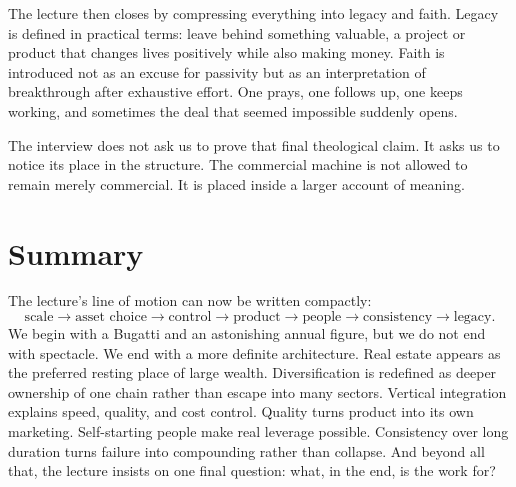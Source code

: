 The lecture then closes by compressing everything into legacy and faith. Legacy is defined in practical terms: leave behind something valuable, a project or product that changes lives positively while also making money. Faith is introduced not as an excuse for passivity but as an interpretation of breakthrough after exhaustive effort. One prays, one follows up, one keeps working, and sometimes the deal that seemed impossible suddenly opens.

The interview does not ask us to prove that final theological claim. It asks us to notice its place in the structure. The commercial machine is not allowed to remain merely commercial. It is placed inside a larger account of meaning.

\section{Summary}

The lecture's line of motion can now be written compactly:
\begin{equation}
\text{scale} \to \text{asset choice} \to \text{control} \to \text{product} \to \text{people} \to \text{consistency} \to \text{legacy}.
\end{equation}
We begin with a Bugatti and an astonishing annual figure, but we do not end with spectacle. We end with a more definite architecture. Real estate appears as the preferred resting place of large wealth. Diversification is redefined as deeper ownership of one chain rather than escape into many sectors. Vertical integration explains speed, quality, and cost control. Quality turns product into its own marketing. Self-starting people make real leverage possible. Consistency over long duration turns failure into compounding rather than collapse. And beyond all that, the lecture insists on one final question: what, in the end, is the work for?